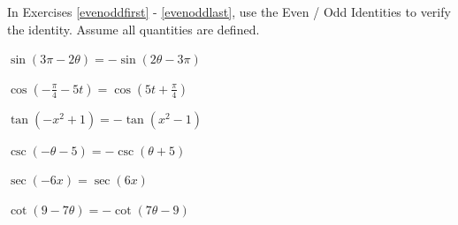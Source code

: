 \documentclass{ximera}
\begin{document}
	\author{Stitz-Zeager}




\begin{question}
    
In Exercises \ref{evenoddfirst} - \ref{evenoddlast}, use the Even / Odd Identities to verify the identity.  Assume all quantities are defined.

\begin{problem}\label{evenoddfirst}
    $\sin(3\pi - 2\theta) = -\sin(2\theta - 3\pi)$
\end{problem}

\begin{problem}
    $\cos \left( -\frac{\pi}{4} - 5t \right) = \cos \left( 5t + \frac{\pi}{4} \right)$
\end{problem}

\begin{problem}
     $\tan(-x^{2} + 1) = -\tan(x^{2} - 1)$
\end{problem}

\begin{problem}
    $\csc(-\theta - 5) = -\csc(\theta + 5)$
\end{problem}

\begin{problem}
    $\sec(-6x) = \sec(6x)$
\end{problem}

\begin{problem}\label{evenoddlast}
     $\cot(9 - 7\theta) = -\cot(7\theta - 9)$
\end{problem}

\end{question}
\end{document}
